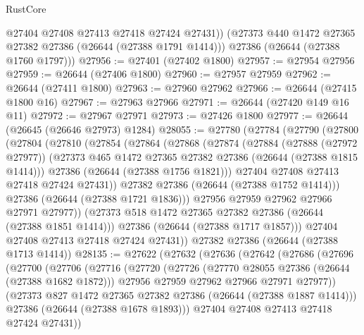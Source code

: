 \begin{lexlean}{RustCore}
\begin{coremodule}
          @27404
          @27408
          @27413
          @27418
          @27424
          @27431))
      (@27373 @440 @1472 @27365 @27382 @27386 (@26644 (@27388 @1791 @1414)))
      @27386
      (@26644 (@27388 @1760 @1797)))
@27956 := @27401 (@27402 @1800)
@27957 := @27954 @27956
@27959 := @26644 (@27406 @1800)
@27960 := @27957 @27959
@27962 := @26644 (@27411 @1800)
@27963 := @27960 @27962
@27966 := @26644 (@27415 @1800 @16)
@27967 := @27963 @27966
@27971 := @26644 (@27420 @149 @16 @11)
@27972 := @27967 @27971
@27973 := @27426 @1800
@27977 := @26644 (@26645 (@26646 @27973) @1284)
@28055 := @27780
    (@27784
      (@27790
        (@27800
          (@27804
            (@27810
              (@27854
                (@27864
                  (@27868
                    (@27874
                      (@27884
                        (@27888 (@27972 @27977))
                        (@27373 @465 @1472 @27365 @27382 @27386 (@26644 (@27388 @1815 @1414)))
                        @27386
                        (@26644 (@27388 @1756 @1821)))
                      @27404
                      @27408
                      @27413
                      @27418
                      @27424
                      @27431))
                  @27382
                  @27386
                  (@26644 (@27388 @1752 @1414)))
                @27386
                (@26644 (@27388 @1721 @1836)))
              @27956
              @27959
              @27962
              @27966
              @27971
              @27977))
          (@27373 @518 @1472 @27365 @27382 @27386 (@26644 (@27388 @1851 @1414)))
          @27386
          (@26644 (@27388 @1717 @1857)))
        @27404
        @27408
        @27413
        @27418
        @27424
        @27431))
    @27382
    @27386
    (@26644 (@27388 @1713 @1414))
@28135 := @27622
    (@27632
      (@27636
        (@27642
          (@27686
            (@27696
              (@27700
                (@27706
                  (@27716
                    (@27720
                      (@27726
                        (@27770 @28055 @27386 (@26644 (@27388 @1682 @1872)))
                        @27956
                        @27959
                        @27962
                        @27966
                        @27971
                        @27977))
                    (@27373 @827 @1472 @27365 @27382 @27386 (@26644 (@27388 @1887 @1414)))
                    @27386
                    (@26644 (@27388 @1678 @1893)))
                  @27404
                  @27408
                  @27413
                  @27418
                  @27424
                  @27431))

\end{coremodule}
\end{lexlean}

